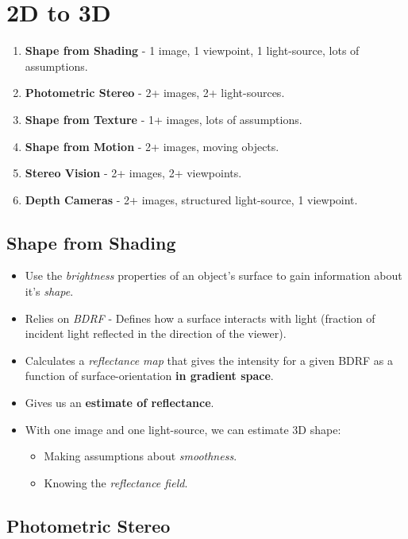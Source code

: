 \documentclass[english, 10pt]{article}
\begin{document}
\section{2D to 3D}

\begin{enumerate}
\item \textbf{Shape from Shading} - 1 image, 1 viewpoint, 1 light-source, lots of assumptions.
\item \textbf{Photometric Stereo} - 2+ images, 2+ light-sources.
\item \textbf{Shape from Texture} - 1+ images, lots of assumptions.
\item \textbf{Shape from Motion} - 2+ images, moving objects.
\item \textbf{Stereo Vision} - 2+ images, 2+ viewpoints.
\item \textbf{Depth Cameras} - 2+ images, structured light-source, 1 viewpoint.
\end{enumerate}

\subsection{Shape from Shading}

\begin{itemize}
\item Use the \textit{brightness} properties of an object's surface to gain information about it's \textit{shape}. 
\item Relies on \textit{BDRF} - Defines how a surface interacts with light (fraction of incident light reflected in the direction of the viewer). 
\item Calculates a \textit{reflectance map} that gives the intensity for a given BDRF as a function of surface-orientation \textbf{in gradient space}.
\item Gives us an \textbf{estimate of reflectance}.
\item With one image and one light-source, we can estimate 3D shape:
\begin{itemize}
\item Making assumptions about \textit{smoothness}.
\item Knowing the \textit{reflectance field}.
\end{itemize}
\end{itemize}

\subsection{Photometric Stereo}
\end{document}
